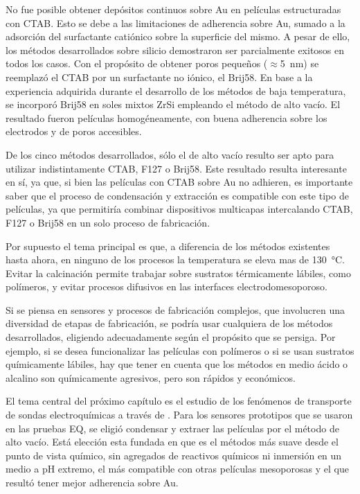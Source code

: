 	No fue posible obtener depósitos continuos sobre Au en películas estructuradas con CTAB. Esto se debe a las limitaciones de adherencia sobre Au, sumado a la adsorción del surfactante catiónico sobre la superficie del mismo. A pesar de ello, los métodos desarrollados sobre silicio demostraron ser parcialmente exitosos en todos los casos. Con el propósito de obtener poros pequeños ($\approx$\SI{5}{\nm}) se reemplazó el CTAB por un surfactante no iónico, el Brij58. En base a la experiencia adquirida durante el desarrollo de los métodos de baja temperatura, se incorporó Brij58 en soles mixtos Zr\textbar Si empleando el método de alto vacío. El resultado fueron películas homogéneamente, con buena adherencia sobre los electrodos y de poros accesibles.

	De los cinco métodos desarrollados, sólo el de alto vacío resulto ser apto para utilizar indistintamente CTAB, F127 o Brij58. Este resultado resulta interesante en sí, ya que, si bien las películas con CTAB sobre Au no adhieren, es importante saber que el proceso de condensación y extracción es compatible con este tipo de películas, ya que permitiría combinar dispositivos multicapas intercalando CTAB, F127 o Brij58 en un solo proceso de fabricación.

		Por supuesto el tema principal es que, a diferencia de los métodos existentes hasta ahora, en ninguno de los procesos la temperatura se eleva mas de \SI{130}{\celsius}. Evitar la calcinación permite trabajar sobre sustratos térmicamente lábiles, como polímeros, y evitar procesos difusivos en las interfaces electrodo\textbar mesoporoso. 

	Si se piensa en sensores y procesos de fabricación complejos, que involucren una diversidad de etapas de fabricación, se podría usar cualquiera de los métodos desarrollados, eligiendo adecuadamente según el propósito que se persiga. Por ejemplo, si se desea funcionalizar las películas con polímeros o si se usan sustratos químicamente lábiles, hay que tener en cuenta que los métodos en medio ácido o alcalino son químicamente agresivos, pero son rápidos y económicos. 

	El tema central del próximo capítulo es el estudio de los fenómenos de transporte de sondas electroquímicas a través de \pdm. Para los sensores prototipos que se usaron en las pruebas EQ, se eligió condensar y extraer las películas por el método de alto vacío. Está elección esta fundada en que es el métodos más suave desde el punto de vista químico, sin agregados de reactivos químicos ni inmersión en un medio a pH extremo, el más compatible con otras películas mesoporosas y el que resultó tener mejor adherencia sobre Au. 			 
